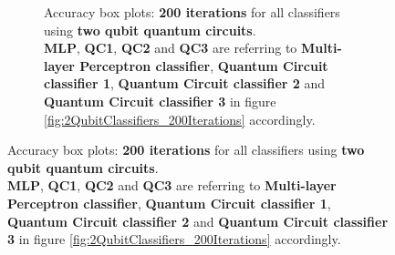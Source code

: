 \begin{figure}[!h]
\begin{subfigure}{1.0\textwidth}
\begin{subfigure}{1.0\textwidth}
{            }
        \end{subfigure}
        \begin{subfigure}{1.0\textwidth}
            \centering
        \end{subfigure}
        \begin{subfigure}{1.0\textwidth}
            \centering
        \end{subfigure}
        \caption{Accuracy box plots: \textbf{200 iterations} for all classifiers using \textbf{two qubit quantum circuits}.\\ \textbf{MLP}, \textbf{QC1}, \textbf{QC2} and \textbf{QC3} are referring to \textbf{Multi-layer Perceptron classifier}, \textbf{Quantum Circuit classifier 1}, \textbf{Quantum Circuit classifier 2} and \textbf{Quantum Circuit classifier 3} in figure \ref{fig:2QubitClassifiers_200Iterations} accordingly.}
        \label{fig:2QubitClassifiers_200Iterations_boxplot}
    \end{subfigure}
\end{figure}

